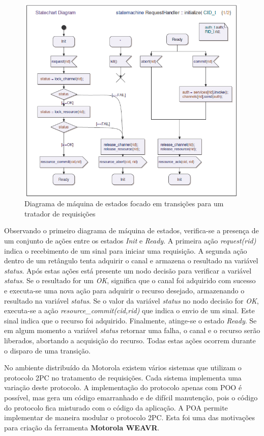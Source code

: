 \begin{figure}
	\centering
	\includegraphics[width=450px]{img/weavr_state_machine_base.png}
	\caption{Diagrama de máquina de estados focado em transições
	para um tratador de requisições}\label{fig:weavr_state_machine_base}
\end{figure}

Observando o primeiro diagrama de máquina de estados, verifica-se a presença de um conjunto de ações entre os estados \textit{Init} e \textit{Ready}. 
A primeira ação \textit{request(rid)} indica o recebimento de um sinal para iniciar uma requisição. A segunda ação dentro de um retângulo tenta
adquirir o canal e armazena o resultado na variável \textit{status}. Após estas ações está presente um nodo decisão para verificar a variável
\textit{status}. Se o resultado for um \textit{OK}, significa que o canal foi adquirido com sucesso e executa-se uma nova ação para adquirir o recurso
desejado, armazenando o resultado na variável \textit{status}. Se o valor da variável \textit{status} no nodo decisão for \textit{OK}, executa-se a
ação \textit{resource\_commit(cid,rid)} que indica o envio de um sinal. Este sinal indica que o recurso foi adquirido. Finalmente, atinge-se o estado
\textit{Ready}. Se em algum momento a variável \textit{status} retornar uma falha, o canal e o recurso serão liberados, abortando a acquisição do
recurso. Todas estas ações ocorrem durante o disparo de uma transição. 

No ambiente distribuído da Motorola existem vários sistemas que utilizam o protocolo 2PC no tratamento de requisições. Cada sistema implementa uma
variação deste protocolo. A implementação do protocolo apenas com POO é possível, mas gera um código emarranhado e de difícil manutenção, pois o
código do protocolo fica misturado com o código da aplicação. A POA permite implementar de maneira modular o protocolo 2PC. Esta foi uma das
motivações para criação da ferramenta \textbf{Motorola WEAVR}. 

